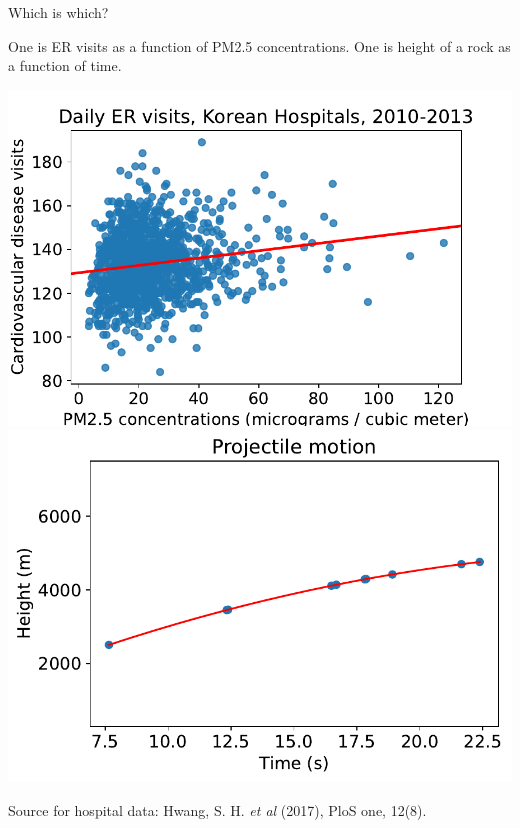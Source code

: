 \documentclass[aspectratio=169, handout]{beamer}
\begin{document}
\begin{frame}{Which is which?}


One is ER visits as a function of PM2.5 concentrations.  One is height of a rock as a function of time.

\includegraphics[scale=0.475]{data/Huang_et_al/huang_pm25vcirc_regplot.pdf}\includegraphics[scale=0.475]{data/Huang_et_al/projectile.pdf}

\begin{tiny}
Source for hospital data: Hwang, S. H. \textit{et al} (2017), PloS one, 12(8).
\end{tiny}

\end{frame}
\end{document}
